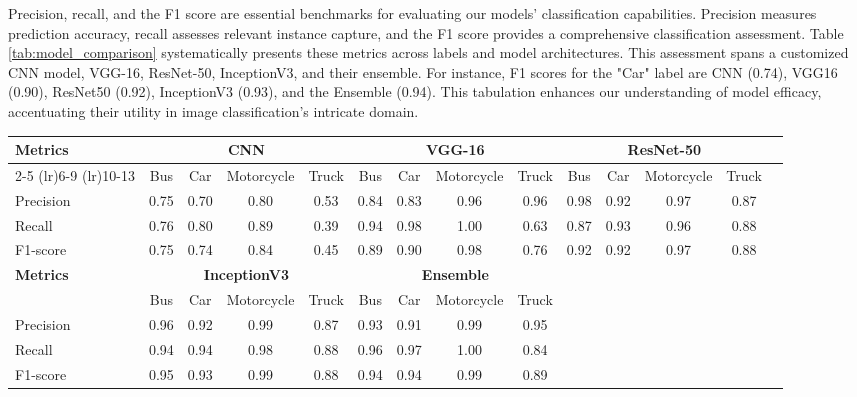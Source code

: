 \documentclass[10pt, conference, a4paper, compsocconf]{IEEEtran}
\begin{document}
\indent Precision, recall, and the F1 score are essential benchmarks for evaluating our models' classification capabilities. Precision measures prediction accuracy, recall assesses relevant instance capture, and the F1 score provides a comprehensive classification assessment. Table \ref{tab:model_comparison} systematically presents these metrics across labels and model architectures. This assessment spans a customized CNN model, VGG-16, ResNet-50, InceptionV3, and their ensemble. For instance, F1 scores for the "Car" label are CNN (0.74), VGG16 (0.90), ResNet50 (0.92), InceptionV3 (0.93), and the Ensemble (0.94). This tabulation enhances our understanding of model efficacy, accentuating their utility in image classification's intricate domain.


\begin{table*}[ht]
\centering
\caption{Model Performance Comparison}
\label{tab:model_comparison}
\begin{tabularx}{\textwidth}{@{}X*{13}{c}@{}}
\toprule
\multirow{2}{*}{\textbf{Metrics}} & \multicolumn{4}{c}{\textbf{CNN}} & \multicolumn{4}{c}{\textbf{VGG-16}} & \multicolumn{4}{c}{\textbf{ResNet-50}} \\
\cmidrule(lr){2-5} \cmidrule(lr){6-9} \cmidrule(lr){10-13}
 & Bus & Car & Motorcycle & Truck & Bus & Car & Motorcycle & Truck & Bus & Car & Motorcycle & Truck \\
\midrule
\rowcolor{lightgray!25}
Precision & 0.75 & 0.70 & 0.80 & 0.53 & 0.84 & 0.83 & 0.96 & 0.96 & 0.98 & 0.92 & 0.97 & 0.87 \\
Recall & 0.76 & 0.80 & 0.89 & 0.39 & 0.94 & 0.98 & 1.00 & 0.63 & 0.87 & 0.93 & 0.96 & 0.88 \\
\rowcolor{lightgray!25}
F1-score & 0.75 & 0.74 & 0.84 & 0.45 & 0.89 & 0.90 & 0.98 & 0.76 & 0.92 & 0.92 & 0.97 & 0.88 \\
\midrule
\multirow{2}{*}{\textbf{Metrics}} & \multicolumn{4}{c}{\textbf{InceptionV3}} & \multicolumn{4}{c}{\textbf{Ensemble}} \\
\cmidrule(lr){2-5} \cmidrule(lr){6-9}
 & Bus & Car & Motorcycle & Truck & Bus & Car & Motorcycle & Truck \\
\midrule
\rowcolor{lightgray!25}
Precision & 0.96 & 0.92 & 0.99 & 0.87 & 0.93 & 0.91 & 0.99 & 0.95 \\
Recall & 0.94 & 0.94 & 0.98 & 0.88 & 0.96 & 0.97 & 1.00 & 0.84 \\
\rowcolor{lightgray!25}
F1-score & 0.95 & 0.93 & 0.99 & 0.88 & 0.94 & 0.94 & 0.99 & 0.89 \\
\bottomrule
\end{tabularx}
\end{table*}
\end{document}
